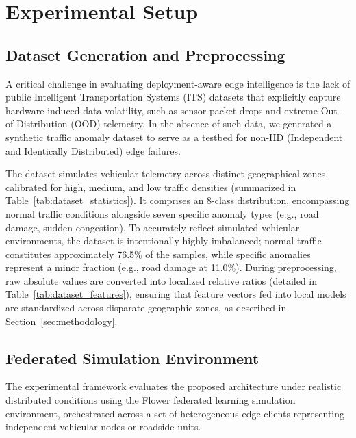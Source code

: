 \section{Experimental Setup}
\label{sec:experiments}

\subsection{Dataset Generation and Preprocessing}

A critical challenge in evaluating deployment-aware edge intelligence is the lack of public Intelligent Transportation Systems (ITS) datasets that explicitly capture hardware-induced data volatility, such as sensor packet drops and extreme Out-of-Distribution (OOD) telemetry. In the absence of such data, we generated a synthetic traffic anomaly dataset to serve as a testbed for non-IID (Independent and Identically Distributed) edge failures.

The dataset simulates vehicular telemetry across distinct geographical zones, calibrated for high, medium, and low traffic densities (summarized in Table~\ref{tab:dataset_statistics}). It comprises an 8-class distribution, encompassing normal traffic conditions alongside seven specific anomaly types (e.g., road damage, sudden congestion). To accurately reflect simulated vehicular environments, the dataset is intentionally highly imbalanced; normal traffic constitutes approximately 76.5\% of the samples, while specific anomalies represent a minor fraction (e.g., road damage at 11.0\%). During preprocessing, raw absolute values are converted into localized relative ratios (detailed in Table~\ref{tab:dataset_features}), ensuring that feature vectors fed into local models are standardized across disparate geographic zones, as described in Section~\ref{sec:methodology}.





\subsection{Federated Simulation Environment}

The experimental framework evaluates the proposed architecture under realistic distributed conditions using the Flower federated learning simulation environment, orchestrated across a set of heterogeneous edge clients representing independent vehicular nodes or roadside units.

